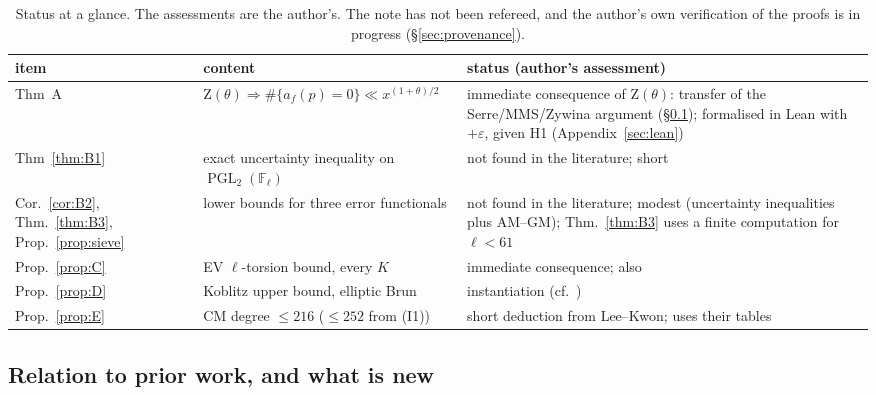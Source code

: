 \documentclass[11pt]{amsart}
\theoremstyle{definition}
\theoremstyle{remark}
\newcommand{\F}{\mathbb{F}}
\DeclareMathOperator{\PGL}{PGL}
\newcommand{\Zt}{\mathrm{Z}}       %
\begin{document}
\begin{table}[h]
\centering
\small
\begin{tabular}{@{}p{}p{}p{}@{}}
\toprule
item & content & status (author's assessment) \\
\midrule
Thm~A & $\Zt(\theta)\Rightarrow\#\{a_f(p)=0\}\ll x^{(1+\theta)/2}$ & immediate consequence of $\Zt(\theta)$: transfer
  of the Serre/MMS/Zywina argument (\S\ref{subsec:novelty}); formalised in Lean with $+\varepsilon$, given H1
  (Appendix~\ref{sec:lean}) \\
Thm~\ref{thm:B1} & exact uncertainty inequality on $\PGL_2(\F_\ell)$ & not found in the literature; short \\
Cor.~\ref{cor:B2}, Thm.~\ref{thm:B3}, Prop.~\ref{prop:sieve} & lower bounds for three error functionals &
  not found in the literature; modest (uncertainty inequalities plus AM--GM); Thm.~\ref{thm:B3} uses a finite
  computation for $\ell<61$ \\
\midrule
Prop.~\ref{prop:C} & EV $\ell$-torsion bound, every $K$ & immediate consequence; also \cite[Cor.~1.4]{FSW} \\
Prop.~\ref{prop:D} & Koblitz upper bound, elliptic Brun & instantiation (cf.\ \cite[footnote~1]{Zyw08}) \\
Prop.~\ref{prop:E} & CM degree $\le216$ ($\le252$ from (I1)) & short deduction from Lee--Kwon; uses their tables \\
\bottomrule
\end{tabular}
\caption{Status at a glance. The assessments are the author's. The note has not been refereed, and the author's own
verification of the proofs is in progress (\S\ref{sec:provenance}).}
\label{tab:status}
\end{table}

\subsection{Relation to prior work, and what is new}\label{subsec:novelty}
\end{document}
